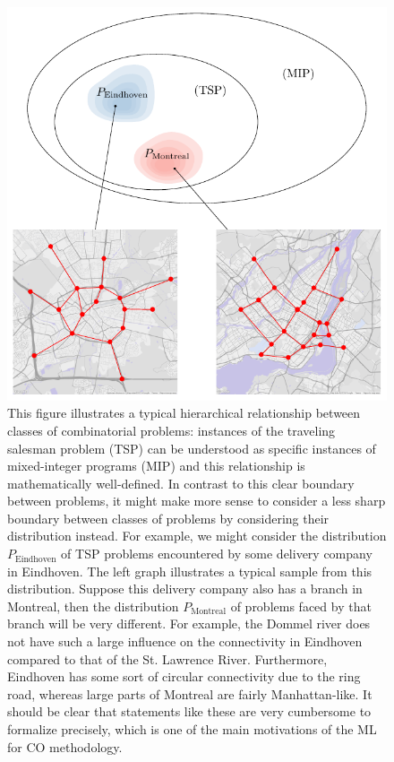 \documentclass[a4paper]{report}
\theoremstyle{definition}
\theoremstyle{plain}
\begin{document}
\begin{figure}
  \centering
  \includegraphics[scale=1]{figures/problem-distribution.pdf}
  \caption{This figure illustrates a typical hierarchical relationship between classes
    of combinatorial problems: instances of the traveling salesman problem (TSP)
    can be understood as specific instances of mixed-integer programs (MIP) and this relationship is mathematically well-defined.
    In contrast to this clear boundary between problems, it might make more
    sense to consider a less sharp boundary between classes of problems by
    considering their distribution instead.
    For example, we might consider the distribution $P_\mathrm{Eindhoven}$ of
    TSP problems encountered by some delivery company in Eindhoven. The left graph illustrates a typical sample from this distribution.
    Suppose this delivery company also has a branch in Montreal, then the distribution $P_\mathrm{Montreal}$ of problems faced by that branch will be very different.
    For example, the Dommel river does not have such a large influence on the
    connectivity in Eindhoven compared to that of the St. Lawrence River.
    Furthermore, Eindhoven has some sort of circular connectivity due to the
    ring road, whereas large parts of Montreal are fairly Manhattan-like. It
    should be clear that statements like these are very cumbersome to formalize
    precisely, which is one of the main motivations of the ML for CO
    methodology.}\label{fig:problem-distribution}
\end{figure}
\end{document}
